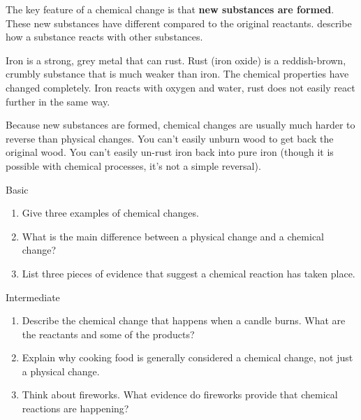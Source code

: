 The key feature of a chemical change is that \textbf{new substances are formed}. These new substances have different  compared to the original reactants.  describe how a substance reacts with other substances.

\begin{example}
Iron is a strong, grey metal that can rust. Rust (iron oxide) is a reddish-brown, crumbly substance that is much weaker than iron.  The chemical properties have changed completely. Iron reacts with oxygen and water, rust does not easily react further in the same way.
\end{example}

Because new substances are formed, chemical changes are usually much harder to reverse than physical changes.  You can't easily unburn wood to get back the original wood.  You can't easily un-rust iron back into pure iron (though it is possible with chemical processes, it's not a simple reversal).

\begin{tieredquestions}{Basic}
\begin{enumerate}
    \item Give three examples of chemical changes.
    \item What is the main difference between a physical change and a chemical change?
    \item List three pieces of evidence that suggest a chemical reaction has taken place.
\end{enumerate}
\end{tieredquestions}

\begin{tieredquestions}{Intermediate}
\begin{enumerate}
    \item Describe the chemical change that happens when a candle burns. What are the reactants and some of the products?
    \item Explain why cooking food is generally considered a chemical change, not just a physical change.
    \item  Think about fireworks. What evidence do fireworks provide that chemical reactions are happening?
\end{enumerate}
\end{tieredquestions}

